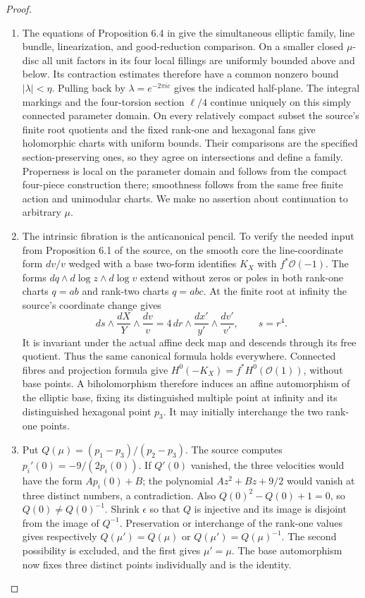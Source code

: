 \begin{proof}

\begin{enumerate}[label={$\langle1\rangle$\arabic*.},leftmargin=*]
\item The equations of Proposition 6.4 in \cite{ViaTwo26push}
give the simultaneous elliptic family, line bundle, linearization,
and good-reduction comparison.  On a smaller closed $\mu$-disc
all unit factors in its four local fillings are uniformly bounded
above and below.  Its contraction estimates therefore have a
common nonzero bound $|\lambda|<\eta$.  Pulling back by
$\lambda=e^{-2\pi i c}$ gives the indicated half-plane.
The integral markings and the four-torsion section $\ell/4$
continue uniquely on this simply connected parameter domain.
On every relatively compact subset the source's finite root
quotients and the fixed rank-one and hexagonal fans give
holomorphic charts with uniform bounds.  Their comparisons are
the specified section-preserving ones, so they agree on
intersections and define a family.  Properness is local on
the parameter domain and follows from the compact four-piece
construction there; smoothness follows from the same free
finite action and unimodular charts.  We make no assertion
about continuation to arbitrary $\mu$.

\item The intrinsic fibration is the anticanonical pencil.  To verify
the needed input from Proposition 6.1 of the source, on the
smooth core the line-coordinate form $dv/v$ wedged with a
base two-form identifies $K_X$ with $f^*\mathcal O(-1)$.
The forms $dq\wedge d\log z\wedge d\log v$ extend without
zeros or poles in both rank-one charts $q=ab$ and rank-two
charts $q=abc$.  At the finite root at infinity the source's
coordinate change gives
\[
 ds\wedge\frac{dX}{Y}\wedge\frac{dv}{v}
 =4\,dr\wedge\frac{dx'}{y'}\wedge\frac{dv'}{v'},
 \qquad s=r^4.
\]
It is invariant under the actual affine deck map and descends
through its free quotient.  Thus the same canonical formula
holds everywhere.  Connected fibres and projection formula
give $H^0(-K_X)=f^*H^0(\mathcal O(1))$, without base points.
A biholomorphism therefore induces an affine automorphism of
the elliptic base, fixing its distinguished multiple point
at infinity and its distinguished hexagonal point $p_3$.
It may initially interchange the two rank-one points.

\item Put $Q(\mu)=(p_1-p_3)/(p_2-p_3)$.
The source computes $p_i'(0)=-9/(2p_i(0))$.
If $Q'(0)$ vanished, the three velocities would have the form
$Ap_i(0)+B$; the polynomial $Az^2+Bz+9/2$ would vanish
at three distinct numbers, a contradiction.
Also $Q(0)^2-Q(0)+1=0$, so $Q(0)\ne Q(0)^{-1}$.
Shrink $\epsilon$ so that $Q$ is injective and its image
is disjoint from the image of $Q^{-1}$.  Preservation or
interchange of the rank-one values gives respectively
$Q(\mu')=Q(\mu)$ or $Q(\mu')=Q(\mu)^{-1}$.
The second possibility is excluded, and the first gives
$\mu'=\mu$.  The base automorphism now fixes three distinct
points individually and is the identity.


\end{enumerate}
\end{proof}
